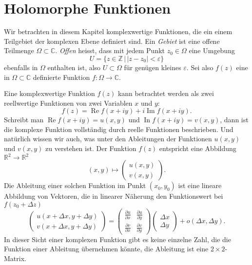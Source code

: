 %
%
%
\section{Holomorphe Funktionen
\label{buch:funktionentheorie:section:holomorph}}

Wir betrachten in diesem Kapitel komplexwertige Funktionen,
%
die ein einem Teilgebiet der komplexen Ebene definiert sind.
Ein {\em Gebiet} ist eine offene Teilmenge $\Omega\subset \mathbb C$.
%
{\em Offen} heisst, dass mit jedem Punkt $z_0\in\Omega$ eine Umgebung
%
%
\[
U=\{z\in\mathbb Z\,|\,|z-z_0|<\varepsilon\}
\]
ebenfalls in $\Omega$ enthalten ist, also $U\subset \Omega$ für genügen
kleines $\varepsilon$.
Sei also $f(z)$ eine in $\Omega\subset\mathbb C$ definierte
Funktion $f\colon\Omega\to\mathbb C$.

Eine komplexwertige Funktion $f(z)$ kann betrachtet werden als zwei
reellwertige Funktionen von zwei Variablen $x$ und $y$:
\[
f(z)=\operatorname{Re}f(x+iy) + i \operatorname{Im}f(x+iy).
\]
Schreibt man
$\operatorname{Re}f(x+iy)=u(x,y)$
und
$\operatorname{In}f(x+iy)=v(x,y)$,
dann ist die komplexe Funktion vollständig durch reelle Funktionen
beschrieben.
Und natürlich wissen wir auch, was unter den Ableitungen der Funktionen
$u(x,y)$ und $v(x,y)$ zu verstehen ist.
Der Funktion $f(z)$ entspricht eine Abbildung $\mathbb R^2\to\mathbb R^2$
%
\[
(x,y)\mapsto\begin{pmatrix}u(x,y)\\v(x,y)\end{pmatrix}.
\]
Die Ableitung einer solchen Funktion im Punkt $(x_0,y_0)$
ist eine lineare Abbildung von Vektoren, die in linearer Näherung
den Funktionswert bei $f(z_0 + \Delta z)$
\[
\begin{pmatrix}
u(x+\Delta x, y +\Delta y)\\
v(x+\Delta x, y +\Delta y)
\end{pmatrix}
=
\begin{pmatrix}
\frac{\partial u}{\partial x}&\frac{\partial u}{\partial y}\\
\frac{\partial v}{\partial x}&\frac{\partial v}{\partial y}
\end{pmatrix}
\begin{pmatrix} \Delta x\\\Delta y \end{pmatrix}
+o(\Delta x, \Delta y).
\]
In dieser Sicht einer komplexen Funktion gibt es keine einzelne Zahl, die
die Funktion einer Ableitung übernehmen könnte, die Ableitung
ist eine $2\times 2$-Matrix.


